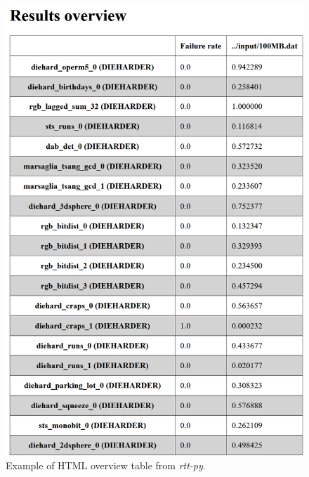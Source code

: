 \documentclass[
  digital,     %
  oneside,     %
  nosansbold,  %
  nocolorbold, %
  nolof,         %
  nolot,         %
]{fithesis4}
\begin{document}
\begin{figure}[h!]
  \begin{center}
    \includegraphics[width=11.5cm]{figures/rtt/rtt-py-table.png}
  \end{center}
  \caption{Example of HTML overview table from \emph{rtt-py}.}
  \label{fig:rtt_py_table_app}
\end{figure}
\end{document}
